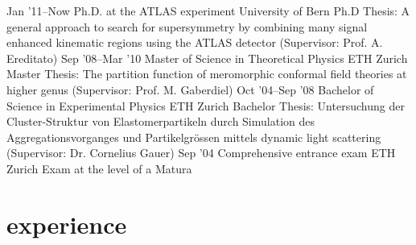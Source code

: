 \documentclass[]{cv} %
\begin{document}
\begin{entrylist}
\entry
{Jan '11--Now}
{Ph.D. {\normalfont at the} ATLAS experiment}
{University of Bern}
{Ph.D Thesis: A general approach to search for supersymmetry by combining many signal enhanced kinematic regions using the ATLAS detector (Supervisor:
  Prof. A. Ereditato)}
\entry
{Sep '08--Mar '10}
{Master {\normalfont of Science in} Theoretical Physics}
{ETH Zurich}
{Master Thesis: The partition function of meromorphic conformal field theories at higher genus (Supervisor: Prof. M. Gaberdiel)}
\entry
{Oct '04--Sep '08}
{Bachelor {\normalfont of Science in} Experimental Physics}
{ETH Zurich}
{Bachelor Thesis: Untersuchung der Cluster-Struktur von Elastomerpartikeln durch Simulation des Aggregationsvorganges und Partikelgr{\"o}ssen mittels dynamic
light scattering (Supervisor: Dr. Cornelius Gauer)}
\entry
{Sep '04}
{Comprehensive entrance exam}
{ETH Zurich}
{Exam at the level of a Matura}
\end{entrylist}

\section{experience}
\end{document}
